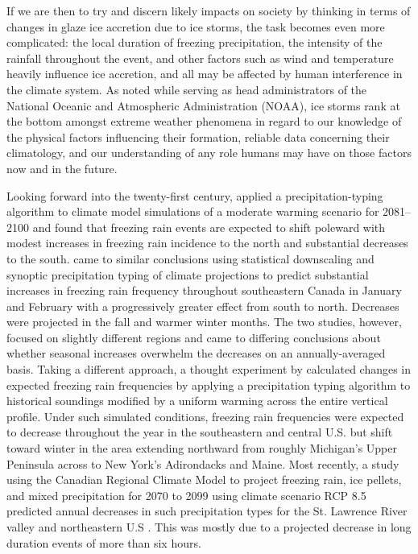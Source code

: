 \documentclass[twocol]{ametsoc}
\begin{document}
If we are then to try and discern likely impacts on society by thinking in terms of changes in glaze ice accretion due to ice storms, the task becomes even more complicated: the local duration of freezing precipitation, the intensity of the rainfall throughout the event, and other factors such as wind and temperature heavily influence ice accretion, and all may be affected by human interference in the climate system.  As \citet{lubchenco2012extreme} noted while serving as head administrators of the National Oceanic and Atmospheric Administration (NOAA), ice storms rank at the bottom amongst extreme weather phenomena in regard to our knowledge of the physical factors influencing their formation, reliable data concerning their climatology, and our understanding of any role humans may have on those factors now and in the future.

Looking forward into the twenty-first century, \citet{lambert2011simulated} applied a precipitation-typing algorithm to climate model simulations of a moderate warming scenario for 2081--2100 and found that freezing rain events are expected to shift poleward with modest increases in freezing rain incidence to the north and substantial decreases to the south. \citet{cheng2011possible} came to similar conclusions using statistical downscaling and synoptic precipitation typing of climate projections to predict substantial increases in freezing rain frequency throughout southeastern Canada in January and February with a progressively greater effect from south to north. Decreases were projected in the fall and warmer winter months. The two studies, however, focused on slightly different regions and came to differing conclusions about whether seasonal increases overwhelm the decreases on an annually-averaged basis. Taking a different approach, a thought experiment by \citet{klima2015ice} calculated changes in expected freezing rain frequencies by applying a precipitation typing algorithm to historical soundings modified by a uniform warming across the entire vertical profile. Under such simulated conditions, freezing rain frequencies were expected to decrease throughout the year in the southeastern and central U.S. but shift toward winter in the area extending northward from roughly Michigan's Upper Peninsula across to New York's Adirondacks and Maine. Most recently, a study using the Canadian Regional Climate Model to project freezing rain, ice pellets, and mixed precipitation for 2070 to 2099 using climate scenario RCP 8.5 predicted annual decreases in such precipitation types for the St. Lawrence River valley and northeastern U.S \citep{matte2018mixed}. This was mostly due to a projected decrease in long duration events of more than six hours. 
\end{document}
